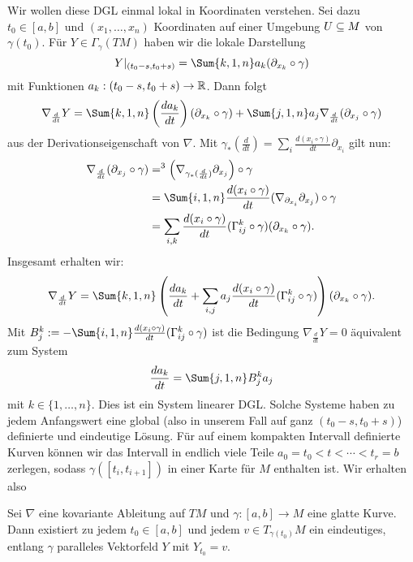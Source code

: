 Wir wollen diese DGL einmal lokal in Koordinaten verstehen. Sei dazu $t_0 \in [a,b]$ und $(x_1, \dots, x_n)$ Koordinaten auf einer Umgebung $U \subseteq M$ von $\gamma (t_0)$. Für $Y \in \Gamma_\gamma (TM)$ haben wir die lokale Darstellung 
\begin{equation}
Y|_{(t_0-s, t_0+s)} = \Sum{k,1,n} a_k (\partial_{x_k} \circ \gamma)
\end{equation}
mit Funktionen $a_k: (t_0-s, t_0+s) \to \mathbb{R}$. Dann folgt
\begin{equation}
\nabla_\frac{d}{dt} Y = \Sum{k,1,n} \left( \frac{da_k}{dt}\right) (\partial_{x_k} \circ \gamma) + \Sum{j,1,n} a_j \nabla_\frac{d}{dt} (\partial_{x_j} \circ \gamma)
\end{equation}
aus der Derivationseigenschaft von $\nabla$. Mit $\gamma_\ast (\frac{d}{dt}) = \sum_i \frac{d (x_i \circ \gamma)}{dt} \partial_{x_i}$ gilt nun: 
\begin{align}
\nabla_\frac{d}{dt} (\partial_{x_j} \circ \gamma) &=^3 \left( \nabla_{\gamma_\ast (\frac{d}{dt} )} \partial_{x_j}\right) \circ \gamma\\
&= \Sum{i,1,n} \frac{d (x_i \circ \gamma)}{dt} (\nabla_{\partial_{x_i}} \partial_{x_j} ) \circ \gamma \\
&= \sum_{i,k} \frac{d (x_i \circ \gamma)}{dt} (\Gamma_{ij}^k \circ \gamma)(\partial_{x_k} \circ \gamma).
\end{align}
Insgesamt erhalten wir:
\begin{equation}
\nabla_\frac{d}{dt}Y = \Sum{k,1,n} \left( \frac{d a_k}{dt} + \sum_{i,j} a_j \frac{d (x_i \circ \gamma)}{dt} (\Gamma_{ij}^k \circ \gamma)\right)(\partial_{x_k} \circ \gamma).
\end{equation}
Mit $B_j^k := - \Sum{i,1,n} \frac{d (x_i \circ \gamma)}{dt} (\Gamma_{ij}^k \circ \gamma)$ ist die Bedingung $\nabla_\frac{d}{dt}  Y = 0$ äquivalent zum System
\begin{equation}
\frac{d a_k}{dt} = \Sum{j,1,n} B_j^k a_j
\end{equation}
mit $k \in \{1, \dots, n \}$. Dies ist ein System linearer DGL. Solche Systeme haben zu jedem Anfangswert eine global (also in unserem Fall auf ganz $(t_0 -s, t_0 +s)$) definierte und eindeutige Lösung. Für auf einem kompakten Intervall definierte Kurven können wir das Intervall in endlich viele Teile $a_0 = t_0 < t < \cdots < t_r =b$ zerlegen, sodass $\gamma([t_i, t_{i+1}])$ in einer Karte für $M$ enthalten ist. Wir erhalten also
\begin{satz}{}{}
Sei $\nabla$ eine kovariante Ableitung auf $TM$ und $\gamma: [a,b] \to M$ eine glatte Kurve. Dann existiert zu jedem $t_0 \in [a,b]$ und jedem $v \in T_{\gamma (t_0)} M$ ein eindeutiges, entlang $\gamma$ paralleles Vektorfeld $Y$ mit $Y_{t_0} = v$.
\end{satz}
